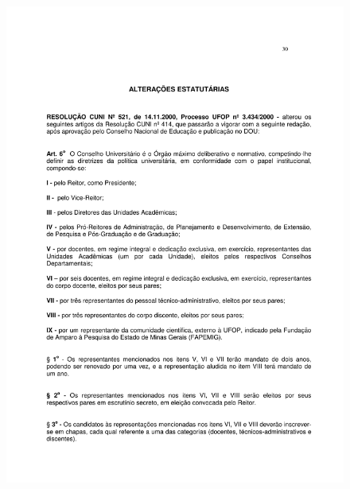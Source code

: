 \begin{figure}[p]
	\centering 
	\includegraphics[scale=0.7]{capitulos/resolucoes/cuni414/cuni414-30.pdf}
\end{figure} \pagebreak

